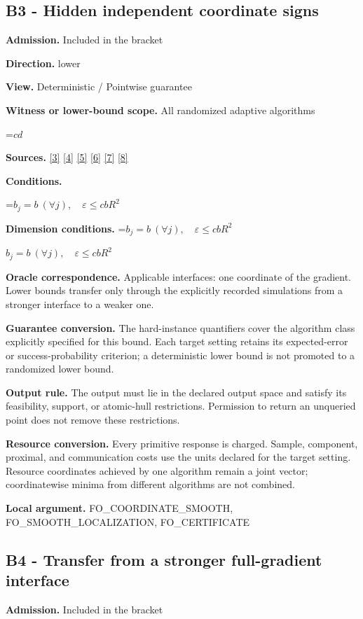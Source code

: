 \documentclass[10pt,a4paper]{article}
\newcommand{\AtlasMath}[1]{\par\begingroup\centering\setbox0=\hbox{$\displaystyle #1$}\ifdim\wd0>1.4\linewidth\typeout{ATLAS WIDE FORMULA: \the\wd0}\fi\ifdim\wd0>\linewidth\resizebox{\linewidth}{!}{\box0}\else\box0\fi\par\endgroup}
\newcommand{\AtlasInlineMath}[1]{\begingroup\setbox0=\hbox{$#1$}\ifdim\wd0>.4\linewidth\endgroup\AtlasMath{#1}\else\endgroup$#1$\fi}
\begin{document}
\subsection{B3 - Hidden independent coordinate signs}
\textbf{Admission.} Included in the bracket

\textbf{Direction.} lower

\textbf{View.} Deterministic / Pointwise guarantee

\textbf{Witness or lower-bound scope.} All randomized adaptive algorithms

\AtlasMath{cd}
\textbf{Sources.} \href{https://arxiv.org/pdf/1405.4980}{[3]} \href{https://arxiv.org/pdf/2101.09740v2}{[4]} \href{https://arxiv.org/pdf/2609.33360v2}{[5]} \href{https://arxiv.org/pdf/2609.10874}{[6]} \href{https://www2.isye.gatech.edu/~nemirovs/MOR_AccuracyCertificates.pdf}{[7]} \href{https://arxiv.org/pdf/2609.20701}{[8]}

\textbf{Conditions.} 
\AtlasMath{b_j=b\ (\forall j),\quad\varepsilon\le cbR^2}


\textbf{Dimension conditions.} \AtlasInlineMath{b_j=b\ (\forall j),\quad\varepsilon\le cbR^2}

\textbf{Oracle correspondence.} Applicable interfaces: one coordinate of the gradient. Lower bounds transfer only through the explicitly recorded simulations from a stronger interface to a weaker one.

\textbf{Guarantee conversion.} The hard-instance quantifiers cover the algorithm class explicitly specified for this bound. Each target setting retains its expected-error or success-probability criterion; a deterministic lower bound is not promoted to a randomized lower bound.

\textbf{Output rule.} The output must lie in the declared output space and satisfy its feasibility, support, or atomic-hull restrictions. Permission to return an unqueried point does not remove these restrictions.

\textbf{Resource conversion.} Every primitive response is charged. Sample, component, proximal, and communication costs use the units declared for the target setting. Resource coordinates achieved by one algorithm remain a joint vector; coordinatewise minima from different algorithms are not combined.

\textbf{Local argument.} FO\_\allowbreak{}COORDINATE\_\allowbreak{}SMOOTH, FO\_\allowbreak{}SMOOTH\_\allowbreak{}LOCALIZATION, FO\_\allowbreak{}CERTIFICATE

\subsection{B4 - Transfer from a stronger full-gradient interface}
\textbf{Admission.} Included in the bracket
\end{document}
